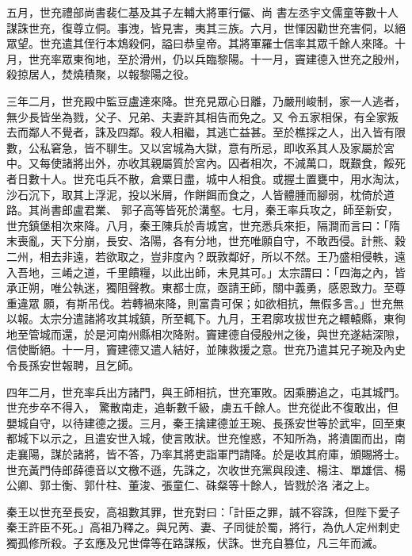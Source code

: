\begin{pinyinscope}
 五月，世充禮部尚書裴仁基及其子左輔大將軍行儼、尚
 書左丞宇文儒童等數十人謀誅世充，復尊立侗。事洩，皆見害，夷其三族。六月，世惲因勸世充害侗，以絕眾望。世充遣其侄行本鴆殺侗，謚曰恭皇帝。其將軍羅士信率其眾千餘人來降。十月，世充率眾東徇地，至於滑州，仍以兵臨黎陽。十一月，竇建德入世充之殷州，殺掠居人，焚燒積聚，以報黎陽之役。



 三年二月，世充殿中監豆盧達來降。世充見眾心日離，乃嚴刑峻制，家一人逃者，無少長皆坐為戮，父子、兄弟、夫妻許其相告而免之。又
 令五家相保，有全家叛去而鄰人不覺者，誅及四鄰。殺人相繼，其逃亡益甚。至於樵採之人，出入皆有限數，公私窘急，皆不聊生。又以宮城為大獄，意有所忌，即收系其人及家屬於宮中。又每使諸將出外，亦收其親屬質於宮內。囚者相次，不減萬口，既艱食，餒死者日數十人。世充屯兵不散，倉粟日盡，城中人相食。或握土置甕中，用水淘汰，沙石沉下，取其上浮泥，投以米屑，作餅餌而食之，人皆體腫而腳弱，枕倚於道路。其尚書郎盧君業、
 郭子高等皆死於溝壑。七月，秦王率兵攻之，師至新安，世充鎮堡相次來降。八月，秦王陳兵於青城宮，世充悉兵來拒，隔澗而言曰：「隋末喪亂，天下分崩，長安、洛陽，各有分地，世充唯願自守，不敢西侵。計熊、穀二州，相去非遠，若欲取之，豈非度內？既敦鄰好，所以不然。王乃盛相侵軼，遠入吾地，三崤之道，千里饋糧，以此出師，未見其可。」太宗謂曰：「四海之內，皆承正朔，唯公執迷，獨阻聲教。東都士庶，亟請王師，關中義勇，感恩致力。至尊重違眾
 願，有斯吊伐。若轉禍來降，則富貴可保；如欲相抗，無假多言。」世充無以報。太宗分遣諸將攻其城鎮，所至輒下。九月，王君廓攻拔世充之轘轅縣，東徇地至管城而還，於是河南州縣相次降附。竇建德自侵殷州之後，與世充遂結深隙，信使斷絕。十一月，竇建德又遣人結好，並陳救援之意。世充乃遣其兄子琬及內史令長孫安世報聘，且乞師。



 四年二月，世充率兵出方諸門，與王師相抗，世充軍敗。因乘勝追之，屯其城門。世充步卒不得入，
 驚散南走，追斬數千級，虜五千餘人。世充從此不復敢出，但嬰城自守，以待建德之援。三月，秦王擒建德並王琬、長孫安世等於武牢，回至東都城下以示之，且遣安世入城，使言敗狀。世充惶惑，不知所為，將潰圍而出，南走襄陽，謀於諸將，皆不答，乃率其將吏詣軍門請降。於是收其府庫，頒賜將士。世充黃門侍郎薛德音以文檄不遜，先誅之，次收世充黨與段達、楊注、單雄信、楊公卿、郭士衡、郭什柱、董浚、張童仁、硃粲等十餘人，皆戮於洛
 渚之上。



 秦王以世充至長安，高祖數其罪，世充對曰：「計臣之罪，誠不容誅，但陛下愛子秦王許臣不死。」高祖乃釋之。與兄苪、妻、子同徙於蜀，將行，為仇人定州刺史獨孤修所殺。子玄應及兄世偉等在路謀叛，伏誅。世充自篡位，凡三年而滅。




\end{pinyinscope}
